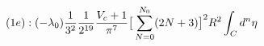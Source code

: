 \begin{equation}
(1e): 
(-\lambda_0)\frac{1}{3^2}\frac{1}{2^{19}}\frac{V_c + 1}{\pi^7}\big{[}\sum_{N=0}^{N_0}(2N + 3)\big{]}^2 R^2\int_Cd^n\eta 
\end{equation}

